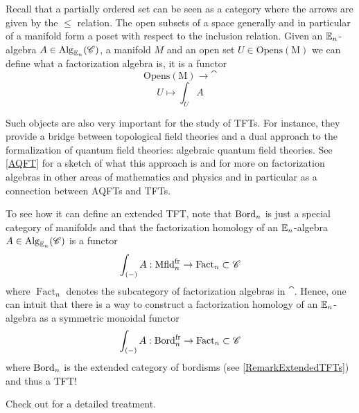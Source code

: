  \begin{defn}\label{FactorAlgebra}
 Recall that a partially ordered set can be seen as a category where the arrows are given by the
  $\leq$ relation. The open subsets of a space generally and in particular of a manifold form a
   poset with respect to the inclusion relation.
   Given an $\mathbb{E}_n$-algebra $A\in\operatorname{Alg}_{\mathbb{E}_{n}}(\mathscr{C})$, a manifold $M$ and an open set
    $U\in\operatorname{Opens(M)}$ we can define what 
   a factorization algebra is, it is a functor
   $$\operatorname{Opens(M)}\to \cat$$
   $$U\mapsto\int_U A$$
 \end{defn}
 Such objects are also very important for the study of TFTs. For instance, they provide a bridge 
 between topological field theories and a dual approach to the formalization of quantum field theories:
 algebraic quantum field theories. See \ref{AQFT} for a sketch of what this approach is and 
 \cite{costello2023factorization} for more on factorization algebras in other areas of
 mathematics and physics and in particular as a connection between AQFTs and 
 TFTs.
 
  To see how it can define an extended TFT, note that $\operatorname{Bord}_n$ is just a special category of manifolds 
 and that the factorization homology of an $\mathbb{E}_n$-algebra $A\in\operatorname{Alg}_{\mathbb{E}_{n}}(\mathscr{C})$ is a functor 
 $$ \int_{(-)}A:\operatorname{Mfld}^{\operatorname{fr}}_{n}\to \operatorname{Fact}_n\subset \mathscr{C}$$
 where $\operatorname{Fact}_n$ denotes the subcategory of factorization algebras in $\cat$. 
 Hence, one can intuit that there is a way to construct a factorization homology of an $\mathbb{E}_n$-algebra
 as a symmetric monoidal functor 
 $$ \int_{(-)}A:\operatorname{Bord}^{\operatorname{fr}}_{n}\to \operatorname{Fact}_n\subset \mathscr{C}$$
 where $\operatorname{Bord}_n$ is the extended category of bordisms (see \ref{RemarkExtendedTFTs}) and thus 
 a TFT! 
 
 Check out \cite{Scheimbauer:2014zty} for a detailed treatment.
